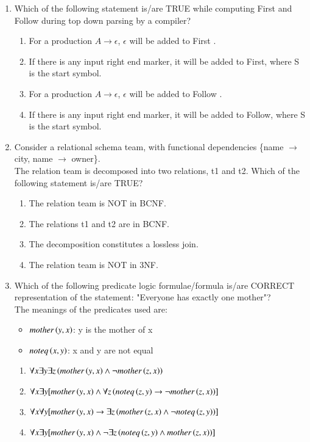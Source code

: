 \documentclass[a4paper, 11pt]{article}
\begin{document}
\begin{enumerate}
    \item Which of the following statement is/are TRUE while computing First and Follow during top down parsing by a compiler?
    \begin{enumerate}
        \item For a production $A \rightarrow \epsilon$, $\epsilon$ will be added to First .
        \item If there is any input right end marker, it will be added to First, where S is the start symbol.
        \item For a production $A \rightarrow \epsilon$, $\epsilon$ will be added to Follow .
        \item If there is any input right end marker, it will be added to Follow, where S is the start symbol.
    \end{enumerate}

    \hfill{}

    \item Consider a relational schema team, with functional dependencies \{name $\rightarrow$ city, name $\rightarrow$ owner\}.\\The relation team is decomposed into two relations, t1 and t2. Which of the following statement is/are TRUE?
    \begin{enumerate}
        \item The relation team is NOT in BCNF.
        \item The relations t1 and t2 are in BCNF.
        \item The decomposition constitutes a lossless join.
        \item The relation team is NOT in 3NF.
    \end{enumerate}
    \hfill{}
    \item Which of the following predicate logic formulae/formula is/are CORRECT representation of the statement: "Everyone has exactly one mother"?\\The meanings of the predicates used are:
    \begin{itemize}
        \item $mother\brak{y,x}$: y is the mother of x
        \item $noteq \brak{x, y}$: x and y are not equal
    \end{itemize}    
    \begin{enumerate}
        \item $\forall x \exists y \exists z \brak{mother\brak{y,x} \land \neg mother\brak{z,x}}$
        \item $\forall x \exists y [mother\brak{y,x} \land \forall z \brak{noteq\brak{z,y} \rightarrow \neg mother\brak{z,x}}]$
        \item $\forall x \forall y [mother\brak{y,x} \rightarrow \exists z \brak{mother\brak{z,x} \land \neg noteq\brak{z,y}}]$
        \item $\forall x \exists y [mother\brak{y,x} \land \neg \exists z \brak{noteq\brak{z,y} \land mother\brak{z,x}}]$
    \end{enumerate}


\end{enumerate}
\end{document}
